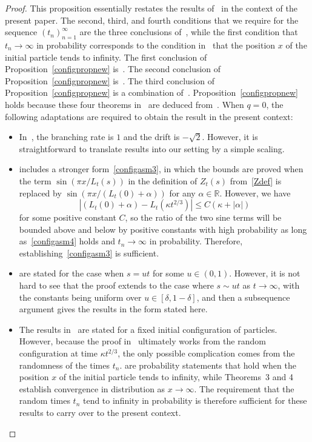 \documentclass[10pt]{amsart}
\theoremstyle{definition}\newtheorem{defi}[theo]{Definition}\newtheorem{rema}[theo]{Remark}\newtheorem{exam}[theo]{Example}\newtheorem{exem}[theo]{Example}\newtheorem{nota}[theo]{Notation}
\newcommand*\R{\mathbb{R}}
\newcommand{\1} {\mathds{1}}
\begin{document}
\begin{proof}
This proposition essentially restates the results of~\cite{bbs3} in the context of the present paper. The second, third, and fourth conditions that we require for the sequence $(t_n)_{n=1}^{\infty}$ are the three conclusions of~\cite[Lemma~15]{bbs3}, while the first condition that $t_n \rightarrow \infty$ in probability corresponds to the condition in~\cite{bbs3} that the position $x$ of the initial particle tends to infinity. The first conclusion of Proposition~\ref{configpropnew} is~\cite[Theorem~1]{bbs3}. The second conclusion of Proposition~\ref{configpropnew} is~\cite[Theorem~2]{bbs3}. The third conclusion of Proposition~\ref{configpropnew} is a combination of~\cite[Theorems~3 and~4]{bbs3}. Proposition~\ref{configpropnew} holds because these four theorems in~\cite{bbs3} are deduced from~\cite[Lemma~15]{bbs3}. When $q = 0$, the following adaptations are required to obtain the result in the present context:
\begin{itemize}
\item In~\cite{bbs3}, the branching rate is $1$ and the drift is $-\sqrt{2}$. However, it is straightforward to translate results into our setting by a simple scaling.

\item \cite[Lemma~15]{bbs3} includes a stronger form~\eqref{configasm3}, in which the bounds are proved when the term $\sin(\pi x/L_t(s))$ in the definition of $Z_t(s)$ from~\eqref{Zdef} is replaced by $\sin(\pi x/(L_t(0) + \alpha))$ for any $\alpha \in \R$. However, we have
\[
\left|\left(L_t(0) + \alpha\right) - L_t\left(\kappa t^{2/3}\right)\right| \leq C(\kappa + |\alpha|)
\]
for some positive constant $C$, so the ratio of the two sine terms will be bounded above and below by positive constants with high probability as long as~\eqref{configasm4} holds and $t_n \rightarrow \infty$ in probability. Therefore, establishing~\eqref{configasm3} is sufficient.

\item \cite[Theorems~2, 3, and~4]{bbs3} are stated for the case when $s = ut$ for some $u \in (0, 1)$. However, it is not hard to see that the proof extends to the case where $s \sim ut$ as $t \rightarrow \infty$, with the constants being uniform over $u \in [\delta, 1 - \delta]$, and then a subsequence argument gives the results in the form stated here.

\item The results in~\cite{bbs3} are stated for a fixed initial configuration of particles. However, because the proof in~\cite{bbs3} ultimately works from the random configuration at time $\kappa t^{2/3}$, the only possible complication comes from the randomness of the times $t_n$. \cite[Theorems~1 and~2]{bbs3} are probability statements that hold when the position $x$ of the initial particle tends to infinity, while Theorems~3 and 4 establish convergence in distribution as $x \rightarrow \infty$. The requirement that the random times $t_n$ tend to infinity in probability is therefore sufficient for these results to carry over to the present context.


\end{itemize}
\end{proof}
\end{document}

